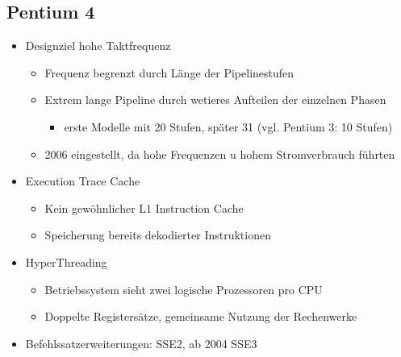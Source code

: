 \subsection{Pentium 4}
\begin{itemize}
	\item Designziel hohe Taktfrequenz
	\begin{itemize}
		\item Frequenz begrenzt durch Länge der Pipelinestufen
		\item Extrem lange Pipeline durch wetieres Aufteilen der einzelnen Phasen
		\begin{itemize}
			\item erste Modelle mit 20 Stufen, später 31 (vgl. Pentium 3: 10 Stufen)
		\end{itemize}
		\item 2006 eingestellt, da hohe Frequenzen u hohem Stromverbrauch führten
	\end{itemize}
	\item Execution Trace Cache
	\begin{itemize}
		\item Kein gewöhnlicher L1 Instruction Cache
		\item Speicherung bereits dekodierter Instruktionen
	\end{itemize}
	\item HyperThreading
	\begin{itemize}
		\item Betriebssystem sieht zwei logische Prozessoren pro CPU
		\item Doppelte Registersätze, gemeinsame Nutzung der Rechenwerke
	\end{itemize}
	\item Befehlssatzerweiterungen: SSE2, ab 2004 SSE3
\end{itemize}
